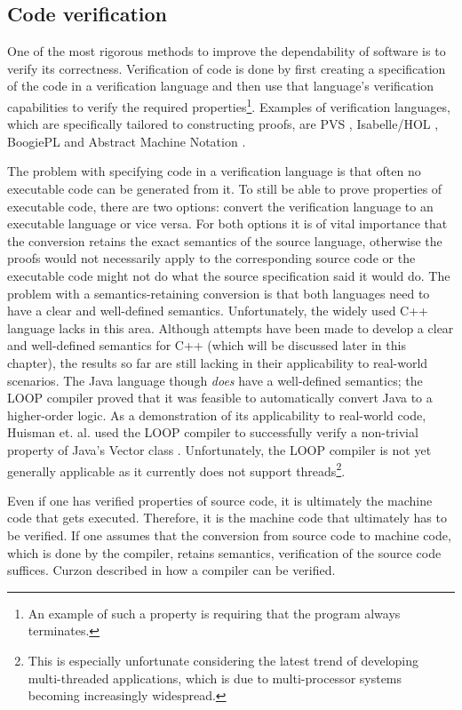 \subsection{Code verification}
One of the most rigorous methods to improve the dependability of software is to verify its correctness. Verification of code is done by first creating a specification of the code in a verification language and then use that language's verification capabilities to verify the required properties\footnote{An example of such a property is requiring that the program always terminates.}. Examples of verification languages, which are specifically tailored to constructing proofs, are PVS \cite{owre-pvs}, Isabelle/HOL \cite{nipkow02isabelle}, BoogiePL \cite{deline05boogiepl} and Abstract Machine Notation \cite{sorensen01towards}.\emptyline

The problem with specifying code in a verification language is that often no executable code can be generated from it. To still be able to prove properties of executable code, there are two options: convert the verification language to an executable language or vice versa. For both options it is of vital importance that the conversion retains the exact semantics of the source language, otherwise the proofs would not necessarily apply to the corresponding source code or the executable code might not do what the source specification said it would do. The problem with a semantics-retaining conversion is that both languages need to have a clear and well-defined semantics. Unfortunately, the widely used C++ language lacks in this area. Although attempts have been made to develop a clear and well-defined semantics for C++ (which will be discussed later in this chapter), the results so far are still lacking in their applicability to real-world scenarios. The Java language though \textsl{does} have a well-defined semantics; the LOOP compiler \cite{vandenberg01loop} proved that it was feasible to automatically convert Java to a higher-order logic. As a demonstration of its applicability to real-world code, Huisman et. al. used the LOOP compiler to successfully verify a non-trivial property of Java's Vector class \cite{huisman99case}. Unfortunately, the LOOP compiler is not yet generally applicable as it currently does not support threads\footnote{This is especially unfortunate considering the latest trend of developing multi-threaded applications, which is due to multi-processor systems becoming increasingly widespread.}.\emptyline

Even if one has verified properties of source code, it is ultimately the machine code that gets executed. Therefore, it is the machine code that ultimately has to be verified. If one assumes that the conversion from source code to machine code, which is done by the compiler, retains semantics, verification of the source code suffices. Curzon described in \cite{curzon92use} how a compiler can be verified.\emptyline

